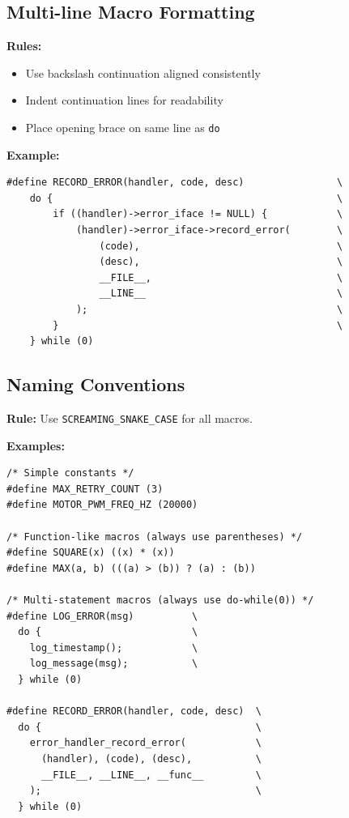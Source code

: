 \subsection{Multi-line Macro Formatting}

\textbf{Rules:}
\begin{itemize}
    \item Use backslash continuation aligned consistently
    \item Indent continuation lines for readability
    \item Place opening brace on same line as \texttt{do}
\end{itemize}

\textbf{Example:}
\begin{verbatim}
#define RECORD_ERROR(handler, code, desc)                \
    do {                                                 \
        if ((handler)->error_iface != NULL) {            \
            (handler)->error_iface->record_error(        \
                (code),                                  \
                (desc),                                  \
                __FILE__,                                \
                __LINE__                                 \
            );                                           \
        }                                                \
    } while (0)
\end{verbatim}

\subsection{Naming Conventions}

\textbf{Rule:} Use \texttt{SCREAMING\_SNAKE\_CASE} for all macros.

\textbf{Examples:}
\begin{verbatim}
/* Simple constants */
#define MAX_RETRY_COUNT (3)
#define MOTOR_PWM_FREQ_HZ (20000)

/* Function-like macros (always use parentheses) */
#define SQUARE(x) ((x) * (x))
#define MAX(a, b) (((a) > (b)) ? (a) : (b))

/* Multi-statement macros (always use do-while(0)) */
#define LOG_ERROR(msg)          \
  do {                          \
    log_timestamp();            \
    log_message(msg);           \
  } while (0)

#define RECORD_ERROR(handler, code, desc)  \
  do {                                     \
    error_handler_record_error(            \
      (handler), (code), (desc),           \
      __FILE__, __LINE__, __func__         \
    );                                     \
  } while (0)
\end{verbatim}

